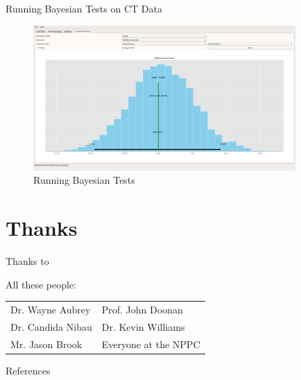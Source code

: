 \documentclass[t, aspectratio=169]{beamer}
\begin{document}
\begin{frame}[label={sec:org5433df0}]{Running Bayesian Tests on CT Data}
\begin{figure}[htbp]
\centering
\includegraphics[width=10cm]{./images/5.png}
\caption{\label{fig:org0e15725}
Running Bayesian Tests}
\end{figure}
\end{frame}



\section{Thanks}
\label{sec:org259b02d}

\begin{frame}[label={sec:orgfcf627f}]{Thanks to}
\begin{block}{All these people:}
\begin{longtable}{ll}
\label{tab:orge599cb2}
\\
Dr. Wayne Aubrey & Prof. John Doonan\\
Dr. Candida Nibau & Dr. Kevin Williams\\
Mr. Jason Brook & Everyone at the NPPC\\
\end{longtable}
\end{block}
\end{frame}
\begin{frame}[label={sec:org0267e39}]{References}


\end{frame}
\end{document}
